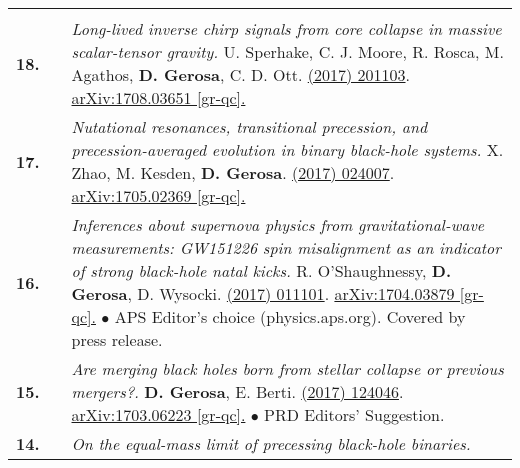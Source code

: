{\begin{longtable}{rp{0.3cm}p{15.8cm}}
\vspace{0.09cm}\\
%
\textbf{18.} & & \textit{Long-lived inverse chirp signals from core collapse in massive scalar-tensor gravity.}
\newline{}
U. Sperhake, C. J. Moore, R. Rosca, M. Agathos, \textbf{D. Gerosa}, C. D. Ott.
\newline{}
\href{http://dx.doi.org/10.1103/PhysRevLett.119.201103}{\prl 119 (2017) 201103}. \href{https://arxiv.org/abs/1708.03651}{arXiv:1708.03651 [gr-qc].}
\vspace{0.09cm}\\
%
\textbf{17.} & & \textit{Nutational resonances, transitional precession, and precession-averaged evolution in binary black-hole systems.}
\newline{}
X. Zhao, M. Kesden, \textbf{D. Gerosa}.
\newline{}
\href{http://dx.doi.org/10.1103/PhysRevD.96.024007}{\prd 96 (2017) 024007}. \href{https://arxiv.org/abs/1705.02369}{arXiv:1705.02369 [gr-qc].}
\vspace{0.09cm}\\
%
\textbf{16.} & & \textit{Inferences about supernova physics from gravitational-wave measurements: GW151226 spin misalignment as an indicator of strong black-hole natal kicks.}
\newline{}
R. O'Shaughnessy, \textbf{D. Gerosa}, D. Wysocki.
\newline{}
\href{http://dx.doi.org/10.1103/PhysRevLett.119.011101}{\prl 119 (2017) 011101}. \href{https://arxiv.org/abs/1704.03879}{arXiv:1704.03879 [gr-qc].}
\newline{}
\textcolor{color1}{$\bullet$} APS Editor's choice (physics.aps.org). Covered by press release.
\vspace{0.09cm}\\
%
\textbf{15.} & & \textit{Are merging black holes born from stellar collapse or previous mergers?.}
\newline{}
\textbf{D. Gerosa}, E. Berti.
\newline{}
\href{http://dx.doi.org/10.1103/PhysRevD.95.124046}{\prd 95 (2017) 124046}. \href{https://arxiv.org/abs/1703.06223}{arXiv:1703.06223 [gr-qc].}
\newline{}
\textcolor{color1}{$\bullet$} PRD Editors' Suggestion.
\vspace{0.09cm}\\
%
\textbf{14.} & & \textit{On the equal-mass limit of precessing black-hole binaries.}
\newline{}

\end{longtable}}
